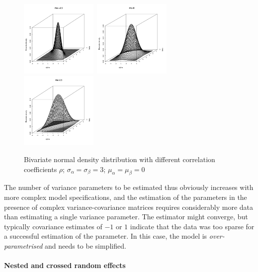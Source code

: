 \begin{figure}[!htpb]
  \centering
  \includegraphics[width=0.33\textwidth]{graphics/multnorm1}~\includegraphics[width=0.33\textwidth]{graphics/multnorm2}~\includegraphics[width=0.33\textwidth]{graphics/multnorm3}
  \caption{Bivariate normal density distribution with different correlation coefficients $\rho$; $\sigma_{\alpha}=\sigma_{\beta}=3$; $\mu_{\alpha}=\mu_{\beta}=0$}
  \label{fig:multnorm}
\end{figure}

The number of variance parameters to be estimated thus obviously increases with more complex model specifications, and the estimation of the parameters in the presence of complex variance-covariance matrices requires considerably more data than estimating a single variance parameter.
The estimator might converge, but typically covariance estimates of $-1$ or $1$ indicate that the data was too sparse for a successful estimation of the parameter.
In this case, the model is \textit{over-parametrised} and needs to be simplified.

\paragraph{Nested and crossed random effects}

